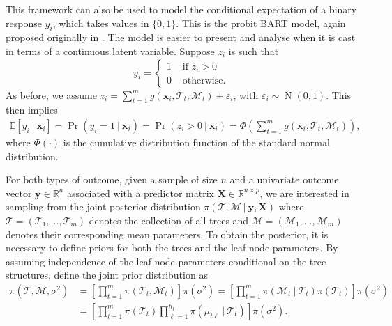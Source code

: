 \documentclass[aoas,preprint]{imsart}
\newcommand\given[1][]{\:#1\vert\:}
\theoremstyle{plain}
\theoremstyle{definition}
\theoremstyle{remark}
\begin{document}
This framework can also be used to model the conditional expectation of a binary response $y_i$, which takes values in $\{0,1\}$. This is the probit BART model, again proposed originally in \citet{chipman2010bart}. The model is easier to present and analyse when it is cast in terms of a continuous latent variable. Suppose $z_i$ is such that
\begin{equation}
y_i = 
    \begin{cases}
        1 & \text{ if } z_i > 0 \\
        0 & \text{ otherwise}.
    \end{cases}
    \label{eq:latent_z}
\end{equation}
As before, we assume
$z_i = \sum^m_{t=1} g\left(\mathbf{x}_i,\mathcal{T}_t,\mathcal{M}_t\right) + \varepsilon_i$,
with $\varepsilon_i \sim \operatorname{N}(0,1)$. 
This then implies
\begin{align*}
    \mathbb{E}\left\lbrack y_i\given \mathbf{x}_i\right\rbrack = \Pr\left(y_i = 1\given \mathbf{x}_i\right) = \Pr\left(z_i > 0\given \mathbf{x}_i\right) = \Phi\left( \sum_{t=1}^{m}g\left(\mathbf{x}_i, \mathcal{T}_t, \mathcal{M}_t\right)\right),
\end{align*}
where $\Phi(\cdot)$ is the cumulative distribution function of the standard normal distribution. 

For both types of outcome, given a sample of size $n$ and a univariate outcome vector $\mathbf{y} \in \mathbb{R}^{n}$ associated with a predictor matrix $\mathbf{X} \in \mathbb{R}^{n\times p}$, we are interested in sampling from the joint posterior distribution $\pi(\boldsymbol{\mathcal{T},\mathcal{M}} \given \mathbf{y}, \mathbf{X})$ where $\boldsymbol{\mathcal{T}} = (\mathcal{T}_{1}, \ldots, \mathcal{T}_{m})$ denotes the collection of all trees and $\boldsymbol{\mathcal{{M}}} = (\mathcal{M}_{1}, \ldots, \mathcal{M}_{m})$ denotes their corresponding mean parameters. To obtain the posterior, it is necessary to define priors for both the trees and the leaf node parameters. By assuming independence of the leaf node parameters conditional on the tree structures, \citet{chipman2010bart} define the joint prior distribution as
\begin{align}
\pi\left(\boldsymbol{\mathcal{T}},\boldsymbol{\mathcal{M}}, \sigma^{2} \right) &= \left\lbrack\prod_{t=1}^{m}\pi\left(\mathcal{T}_{t},\mathcal{M}_{t}\right)\right\rbrack\pi\left(\sigma^{2}\right)  = \left\lbrack\prod_{t=1}^{m}\pi\left(\mathcal{M}_{t} \given{\mathcal{T}_{t}}\right) \pi\left(\mathcal{T}_{t}\right)\right\rbrack\pi\left(\sigma^{2}\right)\nonumber\\
& = \left\lbrack\prod_{t=1}^{m}\pi\left(\mathcal{T}_{t}\right)\prod_{\ell=1}^{h_{t}}\pi\left(\mathcal{\mu}_{t\ell} \given{\mathcal{T}_{t}}\right) \right\rbrack\pi\left(\sigma^{2}\right).\label{eq:joint_prior}
\end{align}
\end{document}

